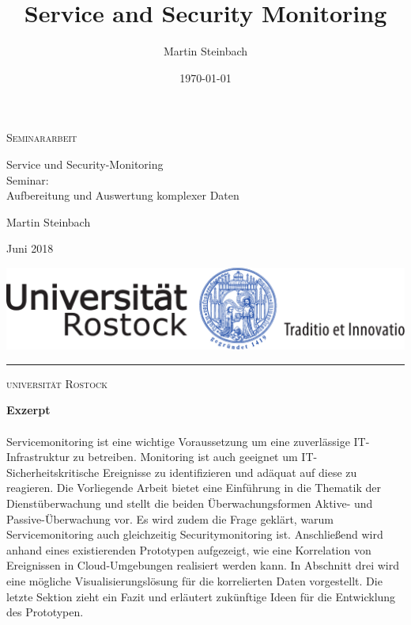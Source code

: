 \documentclass[a4paper,10pt]{scrreprt}
\title{Service and Security Monitoring}
\author{Martin Steinbach}
\date{\today}
\begin{document}
\thispagestyle{empty}
\setcounter{page}{1}
\begin{center}
  
  {\Large \textsc{Seminararbeit}
  
  \vspace{4.25cm}
  
  {\fontsize{22}{22}\selectfont Service und Security-Monitoring\\}
  \vspace{0.75cm}
  {\fontsize{20}{20}\selectfont Seminar:\\\vspace{0.2cm} Aufbereitung und Auswertung 
  komplexer Daten}
}
  
  \vspace{7.25cm}
  
  {\Large Martin Steinbach
    
    \vspace{.15cm}
    
    Juni 2018}
  
  \vspace{1.5cm}
  
  
  \includegraphics[scale=0.5]{img/siegel}
  
  \vspace{0.5cm}
  
  \rule{.7\textwidth}{.40pt}
  
  \vspace{.5cm}
  
  {\large\textsc{universität Rostock}}
    
    \vspace{.15cm}
        
\end{center}
\quad  \addtocounter{page}{-1}
\newpage

\vspace*{\fill}
\textbf{Exzerpt}\\\\
    Servicemonitoring ist eine wichtige Voraussetzung um eine zuverlässige 
    IT-Infrastruktur zu betreiben. Monitoring ist auch geeignet um IT-Sicherheitskritische
    Ereignisse zu identifizieren und adäquat auf diese zu reagieren. Die Vorliegende
    Arbeit bietet eine Einführung in die Thematik der Dienstüberwachung und stellt die
    beiden Überwachungsformen Aktive- und Passive-Überwachung vor. Es wird zudem
    die Frage geklärt, warum Servicemonitoring auch gleichzeitig Securitymonitoring ist.
    Anschließend wird anhand eines existierenden Prototypen aufgezeigt, wie eine 
    Korrelation von Ereignissen in Cloud-Umgebungen realisiert werden kann. In Abschnitt 
    drei wird eine mögliche Visualisierungslösung für die korrelierten Daten vorgestellt. 
    Die letzte Sektion zieht ein Fazit und erläutert zukünftige Ideen für die Entwicklung 
    des Prototypen. 
\vspace*{\fill}
\end{document}
